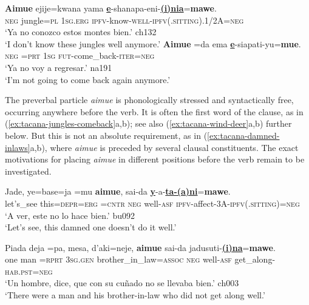 \documentclass[output=paper,draft,draftmode,colorlinks,citecolor=brown]{langscibook}
\begin{document}
\begin{exe}\ex
\label{ex:tacana-jungles-comeback}      
\begin{xlist}
\ex\label{ex:tacana-jungles}  
\gll \textbf{Aimue} ejije=kwana yama \textbf{\uline{e}}-shanapa-eni-\textbf{\uline{(i)nia}}=\textbf{mawe}.\\
    \textsc{neg}  jungle=\textsc{pl}  \textsc{1sg.erg}
    \textsc{ipfv}-know-\textsc{well-ipfv(.sitting)}.1/2A=\textsc{neg}\\
\glt `Ya no conozco estos montes bien.' ch132\\
`I don't know these jungles well anymore.'
\ex\label{ex:tacana-comeback}
\gll  \textbf{Aimue}  =da ema \textbf{\uline{e}}-siapati-yu=\textbf{mue}.\\
    \textsc{neg}  \textsc{=prt}  \textsc{1sg}
    \textsc{fut}-come\_back-\textsc{iter=neg}\\
\glt `Ya no voy a regresar.' na191\\
`I'm not going to come back again anymore.'
\end{xlist}\end{exe}

The preverbal particle \textit{aimue} is phonologically stressed and
syntactically free, occurring anywhere before the verb. It is often
the first word of the clause, as in (\ref{ex:tacana-jungles-comeback}a,b); see also (\ref{ex:tacana-wind-deer}a,b) further below. But this is not an
absolute requirement, as in (\ref{ex:tacana-damned-inlaws}a,b), where \textit{aimue} is
preceded by several clausal constituents. The exact motivations for placing
\textit{aimue} in different positions before the verb remain to be
investigated.

\begin{exe}\ex\label{ex:tacana-damned-inlaws}      
\begin{xlist}
\ex\label{ex:tacana-damned}
\gll  Jade, ye=base=ja{\cb}  =mu  \textbf{aimue},  sai-da
 \textbf{\uline{y}}-a-\textbf{\uline{ta-(a)ni}}=\textbf{mawe}.\\
    let's\_see  this=\textsc{depr}=\textsc{erg}  \textsc{=cntr}
    \textsc{neg}  well-\textsc{asf}
    \textsc{ipfv-}affect-3A-\textsc{ipfv(.sitting)=neg}\\
\glt `A ver, este no lo hace bien.' bu092\\
`Let's see, this damned one doesn't do it well.'

\newpage
\ex\label{ex:tacana-inlaws}
\gll {}Piada deja{\cb} =pa,
{\ob}mesa,  d'aki=neje{\cb},  \textbf{aimue} sai-da
jadusuti-\textbf{\uline{(i)na}}=\textbf{mawe}.\\
one  man  =\textsc{rprt}  \textsc{3sg.gen}
    brother\_in\_law=\textsc{assoc}  \textsc{neg}  well-\textsc{asf}
    get\_along-\textsc{hab.pst=neg}\\
\glt `Un hombre, dice, que con su cuñado no se llevaba bien.' ch003\\
`There were a man and his brother-in-law who did not get along well.'
\end{xlist}\end{exe}
\end{document}

